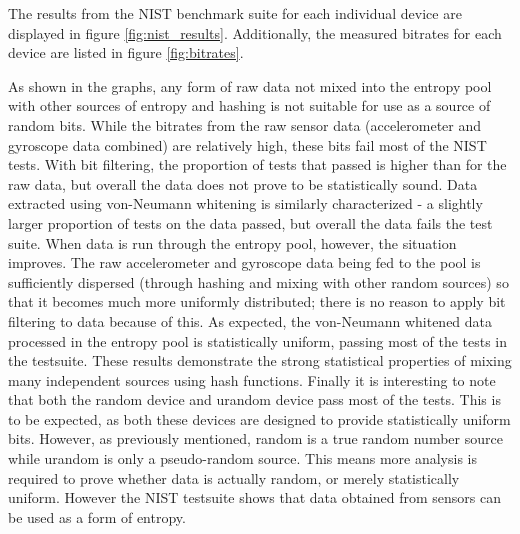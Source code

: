 
The results from the NIST benchmark suite for each individual device are
displayed in figure \ref{fig:nist_results}.  Additionally, the measured
bitrates for each device are listed in figure \ref{fig:bitrates}.

As shown in the graphs, any form of raw data not mixed into the entropy pool
with other sources of entropy and hashing is not suitable for use as a source
of random bits.  While the bitrates from the raw sensor data (accelerometer
and gyroscope data combined) are relatively high, these bits fail most of the
NIST tests.  With bit filtering, the proportion of tests that passed is higher
than for the raw data, but overall the data does not prove to be statistically
sound.  Data extracted using von-Neumann whitening is similarly characterized -
a slightly larger proportion of tests on the data passed, but overall the data
fails the test suite.  When data is run through the entropy pool, however, the
situation improves.  The raw accelerometer and gyroscope data being fed to the
pool is sufficiently dispersed (through hashing and mixing with other random
sources) so that it becomes much more uniformly distributed; there is no
reason to apply bit filtering to data because of this.  As expected, the
von-Neumann whitened data processed in the entropy pool is statistically
uniform, passing most of the tests in the testsuite.  These results demonstrate
the strong statistical properties of mixing many independent sources using hash
functions.  Finally it is interesting to note that both the random device and
urandom device pass most of the tests.  This is to be expected, as both these
devices are designed to provide statistically uniform bits.  However, as
previously mentioned, random is a true random number source while urandom is
only a pseudo-random source.  This means more analysis is required to prove
whether data is actually random, or merely statistically uniform.  However the
NIST testsuite shows that data obtained from sensors can be used as a form of
entropy.


